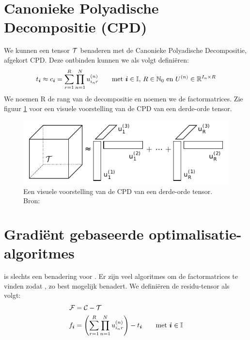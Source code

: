 \section{Canonieke Polyadische Decompositie (CPD)}
We kunnen een tensor $\mathcal{T}$ benaderen met de Canonieke Polyadische Decompositie, afgekort CPD. %
Deze ontbinden kunnen we als volgt defini\"eren:
\[
    t_{\boldsymbol{i}{}} \approx c_{\boldsymbol{i}{}} = \sum_{r=1}^{R} \prod_{n=1}^{N} u^{(n)}_{i_{n}r} \qquad
    \text{met $\boldsymbol{i}{} \in \mathbb{I}$, $R \in \mathbb{N}_0$ en $U^{(n)} \in \mathbb{R}^{I_n \times R} $}
\]
We noemen R de rang van de decompositie en \UUU{} noemen we de factormatrices. Zie figuur \ref{cpdTekening} voor een visuele voorstelling van de CPD van een derde-orde tensor.

\begin{figure}
\centering
\includegraphics{cpd}
\caption{\label{cpdTekening}Een visuele voorstelling van de CPD van een derde-orde tensor. Bron: \cite[p.~4]{laurent}}
\end{figure}


\section{Gradi\"ent gebaseerde optimalisatie-algoritmes}
\label{h:algo} 

\TT{} is slechts een benadering voor \CC{}. Er zijn veel algoritmes om de factormatrices te vinden zodat \CC{}, \TT{} zo best mogelijk benadert. We defini\"eren de residu-tensor \FF{} als volgt:
\begin{align*}
    \mathcal{F} &= \mathcal{C} - \mathcal{T}\\
    f_{\boldsymbol{i}{}} &= \left( \sum_{r=1}^{R} \prod_{n=1}^{N} u^{(n)}_{i_{n}r} \right) - t_{\boldsymbol{i}{}} \qquad \text{met $\boldsymbol{i}{} \in \mathbb{I}$}\\
\end{align*}

